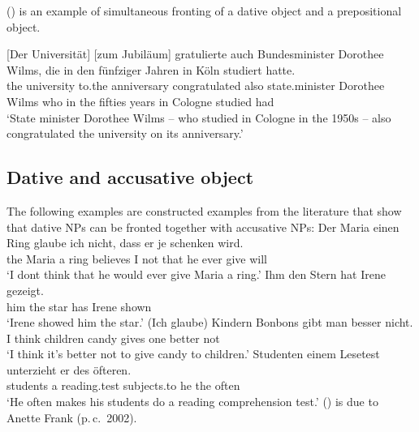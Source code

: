 () is an example of simultaneous fronting of a dative object and a prepositional object.
\begin{sloppypar}
\ea{}
\gll {}[Der Universität] [zum Jubiläum] gratulierte auch Bundesminister Dorothee Wilms, die in den fünfziger Jahren in Köln studiert hatte.\footnotemark\\
	   \spacebr{}the university \spacebr{}to.the anniversary congratulated also state.minister Dorothee Wilms who in the fifties years in Cologne studied had\\
\glt `State minister Dorothee Wilms -- who studied in Cologne in the 1950s -- also congratulated the university on its anniversary.' 
\z
\end{sloppypar}


\subsection{Dative and accusative object}
\label{sec-dat-acc-vf}

The following examples are constructed examples from the literature that show that dative NPs can be
fronted together with accusative NPs:
\eal
\ex 
\gll Der Maria einen Ring glaube ich nicht, dass er je schenken wird.\footnotemark\\
	 the Maria a ring believes I not that he ever give will\\
\glt `I dont think that he would ever give Maria a ring.'
\ex 
\gll Ihm den Stern hat Irene gezeigt.\footnotemark\\
	 him the star has Irene shown\\
\glt `Irene showed him the star.'
\ex 
\gll (Ich glaube) Kindern Bonbons gibt man besser nicht.\footnotemark\\
     I think children candy gives one better not\\
\glt `I think it's better not to give candy to children.'
\zl
\ea 
\gll Studenten einem Lesetest unterzieht er des öfteren.\\
     students a reading.test subjects.to he the often\\
\glt `He often makes his students do a reading comprehension test.'	
\z
() is due to Anette Frank (p.\,c.\ 2002).

